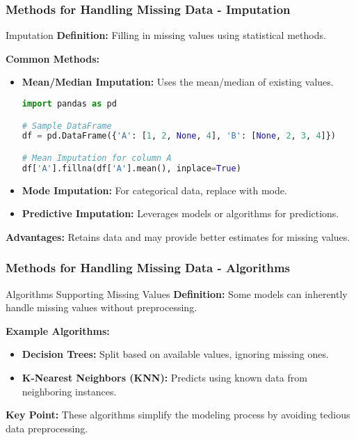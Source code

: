 \documentclass[aspectratio=169]{beamer}
\begin{document}
\begin{frame}[fragile]
    \frametitle{Methods for Handling Missing Data - Imputation}
    \begin{block}{Imputation}
        \textbf{Definition:} Filling in missing values using statistical methods.
        
        \textbf{Common Methods:}
        \begin{itemize}
            \item \textbf{Mean/Median Imputation:} Uses the mean/median of existing values.
            \begin{lstlisting}[language=python]
import pandas as pd

# Sample DataFrame
df = pd.DataFrame({'A': [1, 2, None, 4], 'B': [None, 2, 3, 4]})

# Mean Imputation for column A
df['A'].fillna(df['A'].mean(), inplace=True)
            \end{lstlisting}
            \item \textbf{Mode Imputation:} For categorical data, replace with mode.
            \item \textbf{Predictive Imputation:} Leverages models or algorithms for predictions.
        \end{itemize}
        
        \textbf{Advantages:} Retains data and may provide better estimates for missing values.
    \end{block}
\end{frame}

\begin{frame}[fragile]
    \frametitle{Methods for Handling Missing Data - Algorithms}
    \begin{block}{Algorithms Supporting Missing Values}
        \textbf{Definition:} Some models can inherently handle missing values without preprocessing.
        
        \textbf{Example Algorithms:}
        \begin{itemize}
            \item \textbf{Decision Trees:} Split based on available values, ignoring missing ones.
            \item \textbf{K-Nearest Neighbors (KNN):} Predicts using known data from neighboring instances.
        \end{itemize}
        
        \textbf{Key Point:} These algorithms simplify the modeling process by avoiding tedious data preprocessing.
    \end{block}
\end{frame}
\end{document}
